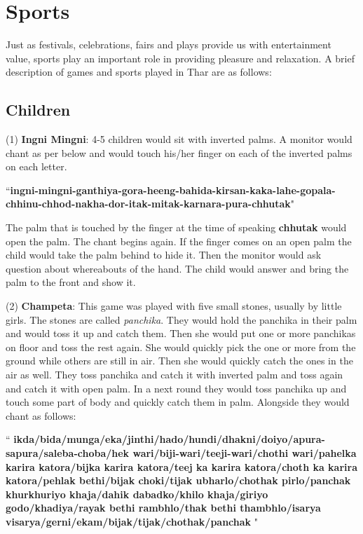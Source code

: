 \chapter{Sports}
Just as festivals, celebrations, fairs and plays provide us with entertainment
value, sports play an important role in providing pleasure and relaxation. A
brief description of games and sports played in Thar are as follows:

\section{Children}

(1) \textbf{Ingni Mingni}: 4-5 children would sit with inverted palms. A
monitor would chant as per below and would touch his/her finger on each of the
inverted palms on each letter.

``\textbf{ingni-mingni-ganthiya-gora-heeng-bahida-kirsan-kaka-lahe-gopala-chhinu-chhod-nakha-dor-itak-mitak-karnara-pura-chhutak}"

The palm that is touched by the finger at the time of speaking \textbf{chhutak}
would open the palm. The chant begins again. If the finger comes on an open
palm the child would take the palm behind to hide it. Then the monitor would
ask question about whereabouts of the hand. The child would answer and bring
the palm to the front and show it.

(2) \textbf{Champeta}: This game was played with five small stones, usually by
little girls. The stones are called \textit{panchika}. They would hold the
panchika in their palm and would toss it up and catch them. Then she would put
one or more panchikas on floor and toss the rest again. She would quickly pick
the one or more from the ground while others are still in air. Then she would
quickly catch the ones in the air as well. They toss panchika and catch it with
inverted palm and toss again and catch it with open palm. In a next round they
would toss panchika up and touch some part of body and quickly catch them in
palm. Alongside they would chant as follows:

``\textbf{
    ikda/bida/munga/eka/jinthi/hado/hundi/dhakni/doiyo/apura-sapura/saleba-choba/hek
    wari/biji-wari/teeji-wari/chothi wari/pahelka karira katora/bijka karira
    katora/teej ka karira katora/choth ka karira katora/pehlak bethi/bijak
    choki/tijak ubharlo/chothak pirlo/panchak khurkhuriyo khaja/dahik
    dabadko/khilo khaja/giriyo godo/khadiya/rayak bethi rambhlo/thak bethi
    thambhlo/isarya visarya/gerni/ekam/bijak/tijak/chothak/panchak }"

